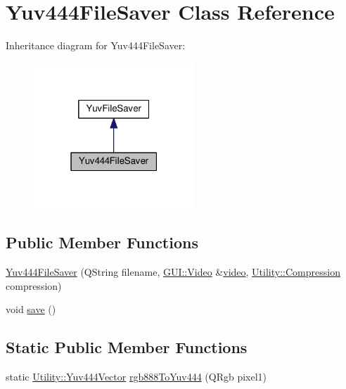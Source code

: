 \hypertarget{classUtility_1_1Yuv444FileSaver}{}\section{Yuv444\+File\+Saver Class Reference}
\label{classUtility_1_1Yuv444FileSaver}


Inheritance diagram for Yuv444\+File\+Saver\+:
\nopagebreak
\begin{figure}[H]
\begin{center}
\leavevmode
\includegraphics[width=171pt]{classUtility_1_1Yuv444FileSaver__inherit__graph}
\end{center}
\end{figure}
\subsection*{Public Member Functions}
\begin{DoxyCompactItemize}
\item 
\hyperlink{classUtility_1_1Yuv444FileSaver_ab6dfdc97c6f71b7e1e5a8b2ee4768df3}{Yuv444\+File\+Saver} (Q\+String filename, \hyperlink{classGUI_1_1Video}{G\+U\+I\+::\+Video} \&\hyperlink{classUtility_1_1YuvFileSaver_a1c4d4daa00ecea5e8390244e057da0df}{video}, \hyperlink{namespaceUtility_a56a83bf6847f4801f4205eb4be237ccf}{Utility\+::\+Compression} compression)
\item 
void \hyperlink{classUtility_1_1Yuv444FileSaver_aae2c382151ef7c9aa913361172b30db6}{save} ()
\end{DoxyCompactItemize}
\subsection*{Static Public Member Functions}
\begin{DoxyCompactItemize}
\item 
static \hyperlink{classUtility_1_1Yuv444Vector}{Utility\+::\+Yuv444\+Vector} \hyperlink{classUtility_1_1Yuv444FileSaver_a9016ab21bfb4c4741ed30631f7808ed4}{rgb888\+To\+Yuv444} (Q\+Rgb pixel1)
\end{DoxyCompactItemize}
